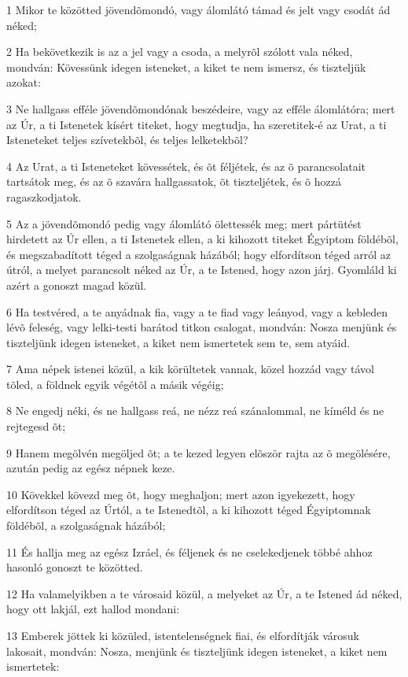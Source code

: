 \par 1 Mikor te közötted jövendõmondó, vagy álomlátó támad és jelt vagy csodát ád néked;
\par 2 Ha bekövetkezik is az a jel vagy a csoda, a melyrõl szólott vala néked, mondván: Kövessünk idegen isteneket, a kiket te nem ismersz, és tiszteljük azokat:
\par 3 Ne hallgass efféle jövendõmondónak beszédeire, vagy az efféle álomlátóra; mert az Úr, a ti Istenetek kísért titeket, hogy megtudja, ha szeretitek-é az Urat, a ti Isteneteket teljes szívetekbõl, és teljes lelketekbõl?
\par 4 Az Urat, a ti Isteneteket kövessétek, és õt féljétek, és az õ parancsolatait tartsátok meg, és az õ szavára hallgassatok, õt tiszteljétek, és õ hozzá ragaszkodjatok.
\par 5 Az a jövendõmondó pedig vagy álomlátó ölettessék meg; mert pártütést hirdetett az Úr ellen, a ti Istenetek ellen, a ki kihozott titeket Égyiptom földébõl, és megszabadított téged a szolgaságnak házából; hogy elfordítson téged arról az útról, a melyet parancsolt néked az Úr, a te Istened, hogy azon járj. Gyomláld ki azért a gonoszt magad közül.
\par 6 Ha testvéred, a te anyádnak fia, vagy a te fiad vagy leányod, vagy a kebleden lévõ feleség, vagy lelki-testi barátod titkon csalogat, mondván: Nosza menjünk és tiszteljünk idegen isteneket, a kiket nem ismertetek sem te, sem atyáid.
\par 7 Ama népek istenei közül, a kik körültetek vannak, közel hozzád vagy távol tõled, a földnek egyik végétõl a másik végéig;
\par 8 Ne engedj néki, és ne hallgass reá, ne nézz reá szánalommal, ne kíméld és ne rejtegesd õt;
\par 9 Hanem megölvén megöljed õt; a te kezed legyen elõször rajta az õ megölésére, azután pedig az egész népnek keze.
\par 10 Kövekkel kövezd meg õt, hogy meghaljon; mert azon igyekezett, hogy elfordítson téged az Úrtól, a te Istenedtõl, a ki kihozott téged Égyiptomnak földébõl, a szolgaságnak házából;
\par 11 És hallja meg az egész Izráel, és féljenek és ne cselekedjenek többé ahhoz hasonló gonoszt te közötted.
\par 12 Ha valamelyikben a te városaid közül, a melyeket az Úr, a te Istened ád néked, hogy ott lakjál, ezt hallod mondani:
\par 13 Emberek jöttek ki közüled, istentelenségnek fiai, és elfordítják városuk lakosait, mondván: Nosza, menjünk és tiszteljünk idegen isteneket, a kiket nem ismertetek:
